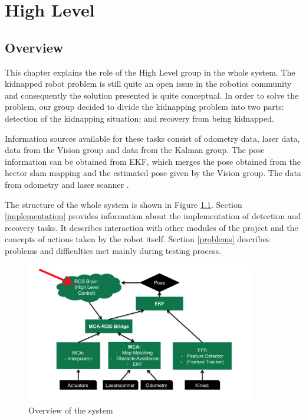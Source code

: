 \chapter{High Level}

\section{Overview}
This chapter explains the role of the High Level group in the whole system. The kidnapped robot problem is still quite an open issue in the robotics community and consequently the solution presented is quite conceptual. In order to solve the problem, our group decided to divide the kidnapping problem into two parts: detection of the kidnapping situation; and recovery from being kidnapped. 

Information sources available for these tasks consist of odometry data, laser data, data from the Vision group and data from the Kalman group. The pose information can be obtained from EKF, which merges the pose obtained from the hector slam mapping and the estimated pose given by the Vision group. The data from odometry and laser scanner . 

The structure of the whole system is shown in Figure \ref{System}. Section \ref{implementation} provides information about the implementation of detection and recovery tasks. It describes interaction with other modules of the project and the concepts of actions taken by the robot itself. Section \ref{problems} describes problems and difficulties met mainly during testing process.

\begin{figure}[htb]
\centering
\includegraphics[width=0.9\textwidth]{graphics/system.png}
\caption{Overview of the system}
\label{System}
\centering
\end{figure}

